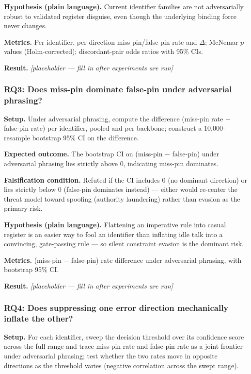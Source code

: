 \documentclass[11pt]{article}
\newcommand{\ph}{\textit{[placeholder --- fill in after experiments are run]}}
\begin{document}
\textbf{Hypothesis (plain language).} Current identifier families are not adversarially robust to validated register disguise, even though the underlying binding force never changes.

\textbf{Metrics.} Per-identifier, per-direction miss-pin/false-pin rate and $\Delta$; McNemar $p$-values (Holm-corrected); discordant-pair odds ratios with 95\% CIs.

\textbf{Result.} \ph

\subsubsection{RQ3: Does miss-pin dominate false-pin under adversarial phrasing?}
\textbf{Setup.} Under adversarial phrasing, compute the difference (miss-pin rate $-$ false-pin rate) per identifier, pooled and per backbone; construct a 10,000-resample bootstrap 95\% CI on the difference.

\textbf{Expected outcome.} The bootstrap CI on (miss-pin $-$ false-pin) under adversarial phrasing lies strictly above 0, indicating miss-pin dominates.

\textbf{Falsification condition.} Refuted if the CI includes 0 (no dominant direction) or lies strictly below 0 (false-pin dominates instead) --- either would re-center the threat model toward spoofing (authority laundering) rather than evasion as the primary risk.

\textbf{Hypothesis (plain language).} Flattening an imperative rule into casual register is an easier way to fool an identifier than inflating idle talk into a convincing, gate-passing rule --- so silent constraint evasion is the dominant risk.

\textbf{Metrics.} (miss-pin $-$ false-pin) rate difference under adversarial phrasing, with bootstrap 95\% CI.

\textbf{Result.} \ph

\subsubsection{RQ4: Does suppressing one error direction mechanically inflate the other?}
\textbf{Setup.} For each identifier, sweep the decision threshold over its confidence score across the full range and trace miss-pin rate and false-pin rate as a joint frontier under adversarial phrasing; test whether the two rates move in opposite directions as the threshold varies (negative correlation across the swept range).
\end{document}
